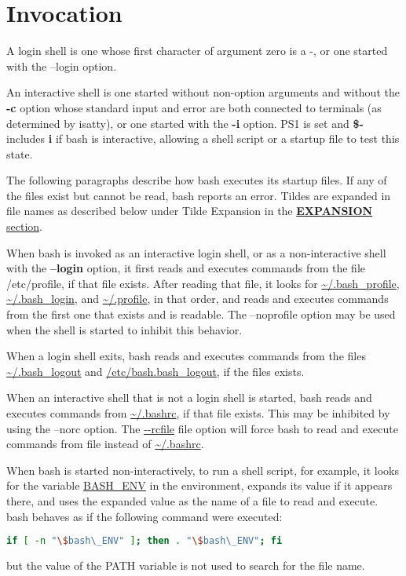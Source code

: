\section{Invocation}\label{sec:invocation}
A login shell is one whose first character of argument zero is a -, or one started with the --login option.

An interactive shell is one started without non-option arguments and without the \textbf{-c} option whose standard input and error are both connected to terminals (as determined by \gls{isatty}), or one started with the \textbf{-i} option. \gls{PS1} is set and \textbf{\$-} includes \textbf{i} if \gls{bash} is interactive, allowing a shell script or a startup file to test this state.

The following paragraphs describe how \gls{bash} executes its startup files. If any of the files exist but cannot be read, \gls{bash} reports an error. Tildes are expanded in file names as described below under Tilde Expansion in the \hyperref[sec:expansion]{\textbf{EXPANSION} section}.

When \gls{bash} is invoked as an interactive login shell, or as a non-interactive shell with the \textbf{--login} option, it first reads and executes commands from the file /etc/profile, if that file exists. After reading that file, it looks for \url{~/.bash_profile}, \url{~/.bash_login}, and \url{~/.profile}, in that order, and reads and executes commands from the first one that exists and is readable. The --noprofile option may be used when the shell is started to inhibit this behavior.

When a login shell exits, \gls{bash} reads and executes commands from the files \url{~/.bash_logout} and \url{/etc/bash.bash_logout}, if the files exists.

When an interactive shell that is not a login shell is started, \gls{bash} reads and executes commands from \url{~/.bashrc}, if that file exists. This may be inhibited by using the --norc option. The \url{--rcfile} file option will force \gls{bash} to read and execute commands from file instead of \url{~/.bashrc}.

When \gls{bash} is started non-interactively, to run a shell script, for example, it looks for the variable \url{BASH_ENV} in the environment, expands its value if it appears there, and uses the expanded value as the name of a file to read and execute.  \Gls{bash} behaves as if the following command were executed:

\begin{lstlisting}[language=bash]
    if [ -n "\$bash\_ENV" ]; then . "\$bash\_ENV"; fi
\end{lstlisting}
but the value of the  \gls{PATH} variable is not used to search for the file name.

